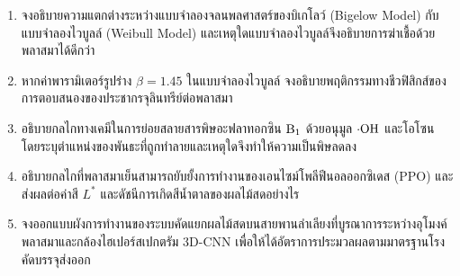 \begin{enumerate}
    \item จงอธิบายความแตกต่างระหว่างแบบจำลองจลนพลศาสตร์ของบิเกโลว์ (Bigelow Model) กับแบบจำลองไวบูลล์ (Weibull Model) และเหตุใดแบบจำลองไวบูลล์จึงอธิบายการฆ่าเชื้อด้วยพลาสมาได้ดีกว่า
    \item หากค่าพารามิเตอร์รูปร่าง $\beta = 1.45$ ในแบบจำลองไวบูลล์ จงอธิบายพฤติกรรมทางชีวฟิสิกส์ของการตอบสนองของประชากรจุลินทรีย์ต่อพลาสมา
    \item อธิบายกลไกทางเคมีในการย่อยสลายสารพิษอะฟลาทอกซิน $\ce{B1}$ ด้วยอนุมูล $\cdot\ce{OH}$ และโอโซน โดยระบุตำแหน่งของพันธะที่ถูกทำลายและเหตุใดจึงทำให้ความเป็นพิษลดลง
    \item อธิบายกลไกที่พลาสมาเย็นสามารถยับยั้งการทำงานของเอนไซม์โพลีฟีนอลออกซิเดส (PPO) และส่งผลต่อค่าสี $L^*$ และดัชนีการเกิดสีน้ำตาลของผลไม้สดอย่างไร
    \item จงออกแบบผังการทำงานของระบบคัดแยกผลไม้สดบนสายพานลำเลียงที่บูรณาการระหว่างอุโมงค์พลาสมาและกล้องไฮเปอร์สเปกตรัม 3D-CNN เพื่อให้ได้อัตราการประมวลผลตามมาตรฐานโรงคัดบรรจุส่งออก
\end{enumerate}
